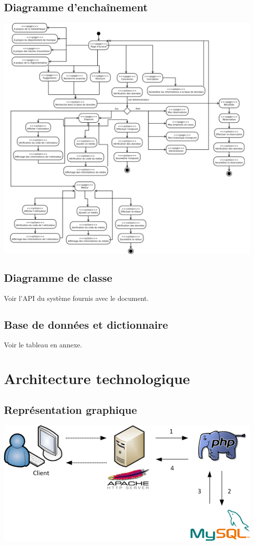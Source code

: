 \documentclass[letter, 10pt]{report}
\begin{document}
\section{Diagramme d'enchaînement}
\includegraphics[scale=0.3]{diagrammeEnchainement.png}

\section{Diagramme de classe}

Voir l'API du système fournis avec le document.

\section{Base de données et dictionnaire}

Voir le tableau en annexe.

\chapter{Architecture technologique}

\section{Représentation graphique}
\includegraphics[scale=0.7]{architectureTechnologique.png}
\end{document}
